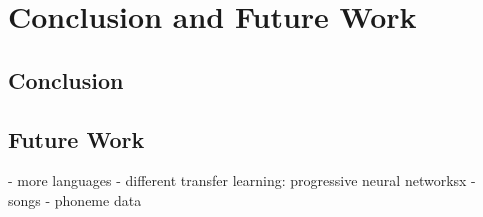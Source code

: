 \section{Conclusion and Future Work}

\subsection{Conclusion}
\subsection{Future Work}


- more languages
- different transfer learning: progressive neural networksx
- songs
- phoneme data